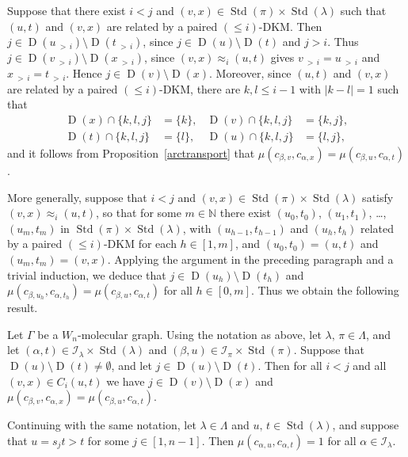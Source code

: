 \documentclass[ALCO,ThmDefs,Unicode,epreuves]{cedram}
\newcommand{\morethan}[2]{#1\,{_{>\,#2}}}
\DeclareMathOperator{\STD}{Std}
\DeclareMathOperator{\D}{D}
\begin{document}
Suppose that there exist $i<j$ and
$(v,x)\in\STD(\pi)\times\STD(\lambda)$ such that $(u,t)$ and $(v,x)$
are related by a paired $(\leqslant i)$-DKM.
Then $j\in\D(\morethan ui)\setminus\D(\morethan ti)$, since $j\in\D(u)\setminus\D(t)$
and $j>i$. Thus $j\in\D(\morethan vi)\setminus\D(\morethan xi)$, since
$(v,x)\approx_i(u,t)$ gives $\morethan vi=\morethan ui$ and $\morethan xi=\morethan ti$.
Hence $j\in\D(v)\setminus\D(x)$. Moreover, since $(u,t)$ and $(v,x)$ are related by a
paired $(\leqslant i)$-DKM,
there are $k,l\leqslant i-1$ with $|k-l|=1$ such that
\begin{align*}
\qquad&&\D(x)\cap \{k,l,j\} &= \{k\},&\D(v)\cap \{k,l,j\} &= \{k,j\},&&\qquad\\
\qquad&&\D(t)\cap \{k,l,j\} &= \{l\},&\D(u)\cap \{k,l,j\} &= \{l,j\},&&\qquad
\end{align*}
and it follows from Proposition~\ref{arctransport}
that $\mu(c_{\beta,v},c_{\alpha,x})=\mu(c_{\beta,u},c_{\alpha,t})$.

More generally, suppose that $i<j$ and $(v,x)\in\STD(\pi)\times\STD(\lambda)$ satisfy
$(v,x)\approx_i (u,t)$, so that for some $m\in\mathbb{N}$ there exist
$(u_0,t_0)$, $(u_1,t_1)$, \dots, $(u_m,t_m)$ in $\STD(\pi)\times\STD(\lambda)$,
with $(u_{h-1},t_{h-1})$ and $(u_h,t_h)$ related by a paired
$(\leqslant i)$-DKM
for each $h\in[1,m]$, and $(u_0,t_0)=(u,t)$
and $(u_m,t_m)=(v,x)$. Applying the argument in the preceding paragraph and a trivial induction,
we deduce that $j\in\D(u_h)\setminus\D(t_h)$ and
$\mu(c_{\beta,u_h},c_{\alpha,t_h})=\mu(c_{\beta,u},c_{\alpha,t})$ for all $h\in[0,m]$.
Thus we obtain the following result.

\begin{lemm}\label{noname0}
Let $\Gamma$ be a $W_n$-molecular graph. Using the notation as above, let $\lambda,\,\pi\in\Lambda$,
and let $(\alpha,t)\in\mathcal{I}_\lambda\times\STD(\lambda)$ and
$(\beta,u)\in\mathcal{I}_\pi\times\STD(\pi)$. Suppose that $\D(u)\setminus\D(t)\neq\emptyset$, and
let $j\in\D(u)\setminus\D(t)$. Then for all $i<j$ and all $(v,x)\in C_i(u,t)$ we have
$j\in\D(v)\setminus\D(x)$ and $\mu(c_{\beta,v},c_{\alpha,x})=\mu(c_{\beta,u},c_{\alpha,t})$.
\end{lemm}

\begin{coro}\label{arweightone}
Continuing with the same notation,
let $\lambda\in\Lambda$ and $u,\,t\in\STD(\lambda)$, and suppose that
$u=s_jt>t$ for some $j\in[1,n-1]$. Then $\mu(c_{\alpha,u},c_{\alpha,t}) = 1$
for all $\alpha\in\mathcal{I}_{\lambda}$.
\end{coro}
\end{document}
